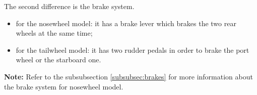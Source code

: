 \documentclass[11pt,a4paper]{article}
\begin{document}
The second difference is the brake system.
\begin{itemize}
\setlength{\itemsep}{0pt}
\item for the nosewheel model: it has a brake lever which brakes the two rear wheels at the same time;
\item for the tailwheel model: it has two rudder pedals in order to brake the port wheel or the starboard one.
\end{itemize}

\textbf{Note:} Refer to the subsubsection \ref{subsubsec:brakes} for more information about the brake system for nosewheel model.
\end{document}
